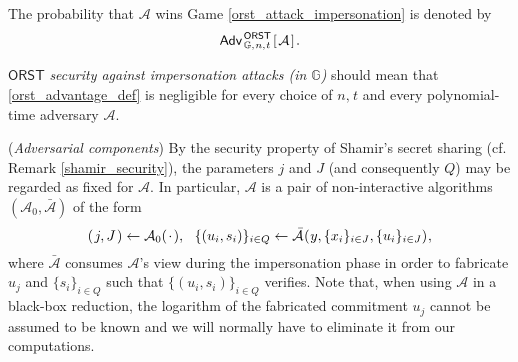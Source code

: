 \documentclass{iacrtrans}
\begin{document}
\noindent
The probability that  $\mathcal{A}$ wins
Game \ref{orst_attack_impersonation}
is denoted by
\vspace{5pt}
\begin{equation}\label{orst_advantage_def}
\mathsf{Adv}
	_{\hspace{1pt}\mathbb{G},\hspace{0.5pt} n,\hspace{0.5pt} t}
	^{\hspace{1pt}\mathsf{ORST}}
	\hspace{1pt}
		[\hspace{1pt}
			\mathcal{A}
		\hspace{1pt}]\hspace{1pt}.
\vspace{5pt}
\end{equation}

\noindent
$\mathsf{ORST}$ \textit{security against impersonation attacks
\textup{(\textit{in} $\mathbb{G}$)}}
should mean that \eqref{orst_advantage_def}
is negligible for every choice of $n,\hspace{1pt} t$
and every polynomial-time adversary $\mathcal{A}$.

\begin{rem}\label{rem_adversarial_components}
(\textit{Adversarial components})
By the security property of
Shamir's secret sharing (cf. Remark \ref{shamir_security}),
the parameters $j$ and $J$ (and consequently $Q$)
may be regarded as fixed for $\mathcal{A}$.
In particular, $\mathcal{A}$ is
a pair of non-interactive algorithms
$(\mathcal{A}_0, \mathcal{\bar{A}})$
of the form
\vspace{5pt}
\begin{equation*}\label{adversary_internal}
(\hspace{1pt}j, J\hspace{1pt})
\leftarrow
\mathcal{A}_0(\hspace{1pt}\cdot\hspace{1pt}),\ \ \{(u_i, s_i)\}_{i \in Q} \leftarrow
\mathcal{\bar{A}}\hspace{0.5pt}
	(
		\hspace{0.5pt}
		y,
		\{x_i\}_{i \in J},
		\{u_i\}_{i \in J}
	)
\hspace{0.5pt},
\vspace{5pt}
\end{equation*}
where $\mathcal{\bar{A}}$ consumes $\mathcal{A}$'s view
during the impersonation phase
in order to fabricate $u_j$ and
$\{s_i\}_{i \in Q}$ such that
$\{(u_i, s_i)\}_{i \in Q}$ verifies.
Note that, when using $\mathcal{A}$
in a black-box reduction,
the logarithm of the fabricated commitment $u_j$
cannot be assumed to be known
and we will normally have to
eliminate it from our computations.
\end{rem}
\end{document}
